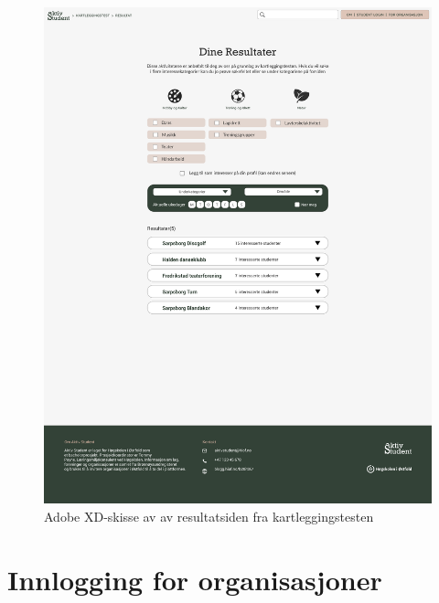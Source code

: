 \begin{figure}[H]
\centering
\includegraphics[width=\textwidth]{Illustrasjoner/Skisser-pdf/3.0/3-14-kartleggingstest-resultat.pdf}
\caption{Adobe XD-skisse av av resultatsiden fra kartleggingstesten}
\label{vedlegg:3-14-resultat-kartlegging}
\end{figure}

\section{Innlogging for organisasjoner}

